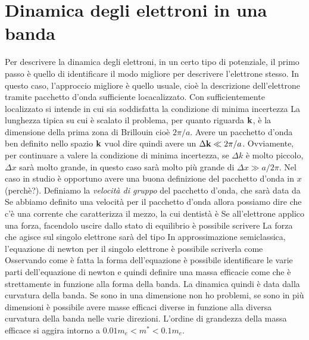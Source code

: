 \section{Dinamica degli elettroni in una banda}
Per descrivere la dinamica degli elettroni, in un certo tipo di potenziale, il primo passo è quello di identificare il modo migliore per descrivere l'elettrone stesso. In questo caso, l'approccio migliore è quello usuale, cioè la descrizione dell'elettrone tramite pacchetto d'onda sufficiente locacalizzato. Con sufficientemente localizzato si intende 
in cui sia soddisfatta la condizione di minima incertezza
La lunghezza tipica su cui è scalato il problema, per quanto riguarda ${\it\bf k}$, è la dimensione della prima zona di Brillouin cioè $2\pi/a$. Avere un pacchetto d'onda ben definito nello spazio ${\it\bf k}$ vuol dire quindi avere un $\Delta {\it\bf k} \ll 2\pi/a$. Ovviamente, per continuare a valere la condizione di minima incertezza, se $\Delta k$ è molto piccolo, $\Delta x$ sarà molto grande, in questo caso sarà molto più grande di $\Delta x \gg a/2\pi$. Nel caso in studio è opportuno avere una buona definizione del pacchetto d'onda in $x$ (perchè?). Definiamo la \textit{velocità di gruppo} del pacchetto d'onda, che sarà data da
Se abbiamo definito una velocità per il pacchetto d'onda allora possiamo dire che c'è una corrente che caratterizza il mezzo, la cui dentistà è
Se all'elettrone applico una forza, facendolo uscire dallo stato di equilibrio \`e possibile scrivere
La forza che agisce sul singolo elettrone sarà del tipo
In approssimazione semiclassica, l'equazione di newton per il singolo elettrone è possibile scriverla come
Osservando come è fatta la forma dell'equazione è possibile identificare le varie parti dell'equazione di newton e quindi definire una massa efficacie come 
che è strettamente in funzione alla forma della banda. La dinamica quindi è data dalla curvatura della banda. Se sono in una dimensione non ho problemi, se sono in più dimensioni \`e possibile avere masse efficaci diverse in funzione alla diversa curvatura della banda nelle varie direzioni. L'ordine di grandezza della massa efficace si aggira intorno a $0.01 m_e < m^* < 0.1 m_e$.
